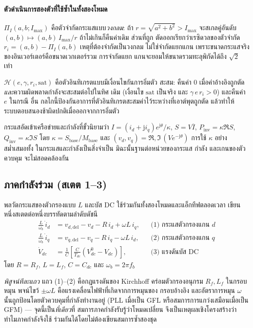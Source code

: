 \documentclass[12pt,a4paper]{article}
\begin{document}
\paragraph{ตัวดำเนินการสองตัวที่ใช้ซ้ำในทั้งสองโหมด}
$\Pi_I(a,b;I_{\max})$ คือตัวจำกัดกระแสแบบ\emph{วงกลม}: ถ้า $r=\sqrt{a^2+b^2}>I_{\max}$
จะสเกลคู่อันดับ $(a,b)\mapsto(a,b)\,I_{\max}/r$ ถ้าไม่เกินก็คืนค่าเดิม ส่วนที่ถูก
ตัดออกเรียกว่าเรซิดวลของตัวจำกัด $r_i=(a,b)-\Pi_I(a,b)$ เหตุที่ต้องจำกัดเป็นวงกลม
ไม่ใช่จำกัดแยกแกน เพราะขนาดกระแสจริงของอินเวอร์เตอร์คือขนาดเวกเตอร์รวม การจำกัดแยก
แกนจะยอมให้ขนาดรวมทะลุพิกัดได้ถึง $\sqrt2$ เท่า

$\mathcal{H}(e,\gamma,r_i,\text{sat})$ คือตัวอินทิเกรตแบบมีเงื่อนไขกันการอิ่มตัว
สะสม: คืนค่า $0$ เมื่อค่าอ้างอิงถูกตัด\emph{และ}ความผิดพลาดกำลังจะสะสมต่อไปในทิศ
เดิม (เงื่อนไข $\text{sat}$ เป็นจริง และ $\gamma\,e\,r_i>0$) และคืนค่า $e$ ในกรณี
อื่น กลไกนี้ป้องกันอาการที่ตัวอินทิเกรตสะสมค่าไว้ระหว่างที่เอาต์พุตถูกตัด แล้วทำให้
ระบบตอบสนองช้าผิดปกติเมื่อออกจากการอิ่มตัว

กระแสอัดเข้าเครือข่ายและกำลังที่ขั้วนิยามว่า
$I=(i_d+\mathrm{j}i_q)e^{\mathrm{j}\theta}/\kappa$, $S=V\overline{I}$,
$P_{\mathrm{inv}}=\kappa\Re S$, $Q_{\mathrm{inv}}=\kappa\Im S$ โดย
$\kappa=S_{\mathrm{base}}/M_{\mathrm{base}}$ และ
$(v_d,v_q)=\Re,\Im\,(Ve^{-\mathrm{j}\theta})$ การใช้ $\kappa$ อย่างสม่ำเสมอทั้ง
ในกระแสและกำลังเป็นสิ่งจำเป็น มิฉะนั้นฐานต่อหน่วยของกระแส กำลัง และเกนของตัวควบคุม
จะไม่สอดคล้องกัน

\subsection{ภาคกำลังร่วม (สเตต 1--3)}
พลวัตกระแสของตัวกรองแบบ $L$ และบัส DC ใช้ร่วมกันทั้งสองโหมดและแอ็กทีฟตลอดเวลา
เขียนหนึ่งสเตตต่อหนึ่งบรรทัดตามลำดับดัชนี
\begin{align}
  \tfrac{L}{\omega_b}\,\dot{i}_d &= v_{d,\mathrm{del}}-v_d-R\,i_d+\omega L\,i_q,
    &&\text{(1) กระแสตัวกรองแกน $d$}\\
  \tfrac{L}{\omega_b}\,\dot{i}_q &= v_{q,\mathrm{del}}-v_q-R\,i_q-\omega L\,i_d,
    &&\text{(2) กระแสตัวกรองแกน $q$}\\
  \dot{V}_{dc} &= \tfrac{1}{C}\!\left[\tfrac{C}{T_{dc}}(V_{dc}^{0}-V_{dc})\right],
    &&\text{(3) แรงดันบัส DC}
\end{align}
โดย $R=R_f$, $L=L_f$, $C=C_{dc}$ และ $\omega_b=2\pi f_b$

\emph{พิสูจน์ทีละแถว} แถว (1)--(2) คือกฎแรงดันของ Kirchhoff คร่อมตัวกรองอนุกรม
$R_f,L_f$ ในกรอบหมุน พจน์ไขว้ $\pm\omega L$ คือแรงเคลื่อนไฟฟ้าที่เกิดจากการหมุนของ
กรอบอ้างอิง และอัตราการหมุน $\omega$ นั้นถูกป้อนโดยตัวควบคุมที่กำลังทำงานอยู่ (PLL
เมื่อเป็น GFL หรือสมการการแกว่งเสมือนเมื่อเป็น GFM) --- จุดนี้เป็น\emph{ที่เดียว}ที่
สมการภาคกำลังรับรู้ว่าโหมดเปลี่ยน จึงเป็นเหตุผลเชิงโครงสร้างว่าทำไมภาคกำลังจึงใช้
ร่วมกันได้โดยไม่ต้องเขียนสมการซ้ำสองชุด
\end{document}
